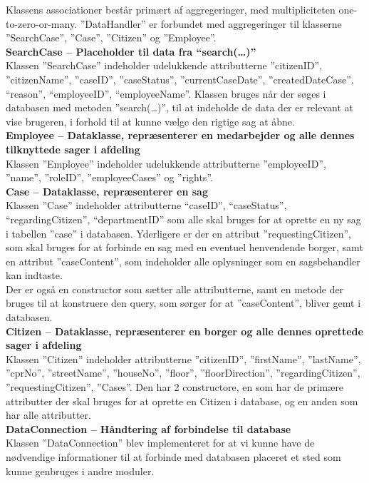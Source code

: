 Klassens associationer består primært af aggregeringer, med multipliciteten one-to-zero-or-many. ”DataHandler” er forbundet med aggregeringer til klasserne ”SearchCase”, ”Case”, ”Citizen” og ”Employee”. \\
\textbf{SearchCase – Placeholder til data fra “search(…)”}\\
Klassen ”SearchCase” indeholder udelukkende attributterne ”citizenID”, ”citizenName”, ”caseID”, ”caseStatus”, ”currentCaseDate”, ”createdDateCase”, “reason”, “employeeID”, “employeeName”.  Klassen bruges når der søges i databasen med metoden ”search(…)”, til at indeholde de data der er relevant at vise brugeren, i forhold til at kunne vælge den rigtige sag at åbne.\\
\textbf{Employee – Dataklasse, repræsenterer en medarbejder og alle dennes tilknyttede sager i afdeling}\\
Klassen ”Employee” indeholder udelukkende attributterne ”employeeID”, ”name”, ”roleID”, ”employeeCases” og ”rights”. \\
\textbf{Case – Dataklasse, repræsenterer en sag}\\
Klassen ”Case” indeholder attributterne “caseID”, “caseStatus”, “regardingCitizen”, “departmentID” som alle skal bruges for at oprette en ny sag i tabellen ”case” i databasen. Yderligere er der en attribut ”requestingCitizen”, som skal bruges for at forbinde en sag med en eventuel henvendende borger, samt en attribut ”caseContent”, som indeholder alle oplysninger som en sagsbehandler kan indtaste. \\
Der er også en constructor som sætter alle attributterne, samt en metode der bruges til at konstruere den query, som sørger for at ”caseContent”, bliver gemt i databasen.\\
\textbf{Citizen – Dataklasse, repræsenterer en borger og alle dennes oprettede sager i afdeling}\\
Klassen ”Citizen” indeholder attributterne ”citizenID”, ”firstName”, ”lastName”, ”cprNo”, ”streetName”, ”houseNo”, ”floor”, ”floorDirection”, ”regardingCitizen”, ”requestingCitizen”, ”Cases”. Den har 2 constructore, en som har de primære attributter der skal bruges for at oprette en Citizen i database, og en anden som har alle attributter.\\
\textbf{DataConnection – Håndtering af forbindelse til database}\\
Klassen ”DataConnection” blev implementeret for at vi kunne have de nødvendige informationer til at forbinde med databasen placeret et sted som kunne genbruges i andre moduler. \\
